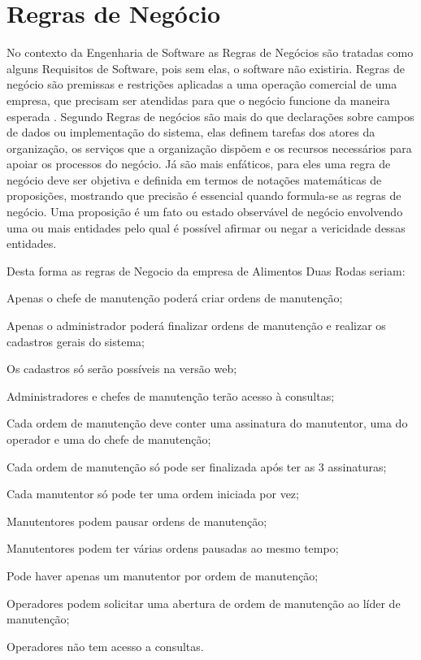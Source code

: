 {%
\section{Regras de Negócio}
No contexto da Engenharia de Software as Regras de Negócios são tratadas como alguns Requisitos de Software, pois sem elas, o software não existiria. Regras de negócio são premissas e restrições aplicadas a uma operação comercial de uma empresa, que precisam ser atendidas para que o negócio funcione da maneira esperada \cite{crerie2008identificacao}.
Segundo \cite{2001SilviaInes} Regras de negócios são mais do que declarações sobre campos de dados ou implementação do sistema, elas definem tarefas dos atores da organização, os serviços que a organização dispõem e os recursos necessários para apoiar os processos do negócio.
Já \cite{1997kilovSimmonds} são mais enfáticos, para eles uma regra de negócio deve ser objetiva e definida em termos de notações matemáticas de proposições, mostrando que precisão é essencial quando formula-se as regras de negócio. Uma proposição é um fato ou estado observável de negócio envolvendo uma ou mais entidades pelo qual é possível afirmar ou negar a vericidade dessas entidades.

Desta forma as regras de Negocio da empresa de Alimentos Duas Rodas seriam:

\begin{subalineas}
	\item {Apenas o chefe de manutenção poderá criar ordens de manutenção};
	\item {Apenas o administrador poderá finalizar ordens de manutenção e realizar os cadastros gerais do sistema};
	\item {Os cadastros só serão possíveis na versão web};
	\item {Administradores e chefes de manutenção terão acesso à consultas};
	\item {Cada ordem de manutenção deve conter uma assinatura do manutentor, uma do operador e uma do chefe de manutenção};
	\item {Cada ordem de manutenção só pode ser finalizada após ter as 3 assinaturas};
	\item {Cada manutentor só pode ter uma ordem iniciada por vez};
	\item {Manutentores podem pausar ordens de manutenção};
	\item {Manutentores podem ter várias ordens pausadas ao mesmo tempo};
	\item {Pode haver apenas um manutentor por ordem de manutenção};
	\item {Operadores podem solicitar uma abertura de ordem de manutenção ao líder de manutenção};
	\item {Operadores não  tem acesso a consultas}.
\end{subalineas}

}

